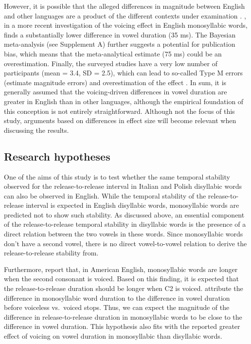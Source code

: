 \documentclass[
  12pt,
  a4paper,
]{article}
\begin{document}
However, it is possible that the alleged differences in magnitude
between English and other languages are a product of the different
contexts under examination \citep{laeufer1992}. \citet{ko2018}, in a
more recent investigation of the voicing effect in English monosyllabic
words, finds a substantially lower difference in vowel duration (35 ms).
The Bayesian meta-analysis (see Supplement A) further suggests a
potential for publication bias, which means that the meta-analytical
estimate (75 ms) could be an overestimation. Finally, the surveyed
studies have a very low number of participants (mean = 3.4, SD = 2.5),
which can lead to so-called Type M errors (estimate magnitude errors)
and overestimation of the effect \citep{kirby2018, roettger2019}. In
sum, it is generally assumed that the voicing-driven differences in
vowel duration are greater in English than in other languages, although
the empirical foundation of this conception is not entirely
straightforward. Although not the focus of this study, arguments based
on differences in effect size will become relevant when discussing the
results.

\hypertarget{research-hypotheses}{%
\subsection{Research hypotheses}\label{research-hypotheses}}

\label{s:hypo}

One of the aims of this study is to test whether the same temporal
stability observed for the release-to-release interval in Italian and
Polish disyllabic words can also be observed in English. While the
temporal stability of the release-to-release interval is expected in
English disyllabic words, monosyllabic words are predicted not to show
such stability. As discussed above, an essential component of the
release-to-release temporal stability in disyllabic words is the
presence of a direct relation between the two vowels in these words.
Since monosyllabic words don't have a second vowel, there is no direct
vowel-to-vowel relation to derive the release-to-release stability from.

Furthermore, \citet{jacewicz2009} report that, in American English,
monosyllabic words are longer when the second consonant is voiced. Based
on this finding, it is expected that the release-to-release duration
should be longer when C2 is voiced. \citet{jacewicz2009} attribute the
difference in monosyllabic word duration to the difference in vowel
duration before voiceless vs.~voiced stops. Thus, we can expect the
magnitude of the difference in release-to-release duration in
monosyllabic words to be close to the difference in vowel duration. This
hypothesis also fits with the reported greater effect of voicing on
vowel duration in monosyllabic than disyllabic words.
\end{document}
